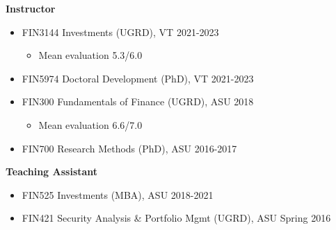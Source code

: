 \documentclass[11pt]{article}
\renewcommand{\section}[1]{\pagebreak[3]%
    \hyphenpenalty=10000%
    \vspace{1.3\baselineskip}%
    \phantomsection\addcontentsline{toc}{section}{#1}%
    \noindent\llap{\scshape\smash{\parbox[t]{\marginparwidth}{\raggedright #1}}}%
    \vspace{-\baselineskip}\par}
\newenvironment{innerlist}[1][\enskip\textbullet]%
        {\begin{itemize}[#1,leftmargin=*,parsep=0pt,itemsep=0pt,topsep=0pt,partopsep=0pt]}
        {\end{itemize}}
\newcommand{\halfblankline}{\quad\vspace{-0.5\baselineskip}\pagebreak[3]}
\begin{document}
\textbf{Instructor}
\begin{innerlist}
        \item[] FIN3144 Investments (UGRD), VT \hfill 2021-2023
        \begin{innerlist}
                \item[] Mean evaluation 5.3/6.0
        \end{innerlist} 
        \item[] FIN5974 Doctoral Development (PhD), VT \hfill 2021-2023
	\item[] FIN300 Fundamentals of Finance (UGRD), ASU \hfill 2018
	\begin{innerlist}
                \item[] Mean evaluation 6.6/7.0
        \end{innerlist} 
	\item[] FIN700 Research Methods (PhD), ASU \hfill 2016-2017
\end{innerlist}

\halfblankline

\textbf{Teaching Assistant}
\begin{innerlist}
	\item[] FIN525 Investments (MBA), ASU \hfill 2018-2021
	\item[] FIN421 Security Analysis \& Portfolio Mgmt (UGRD), ASU \hfill Spring 2016
\end{innerlist}


\end{document}
